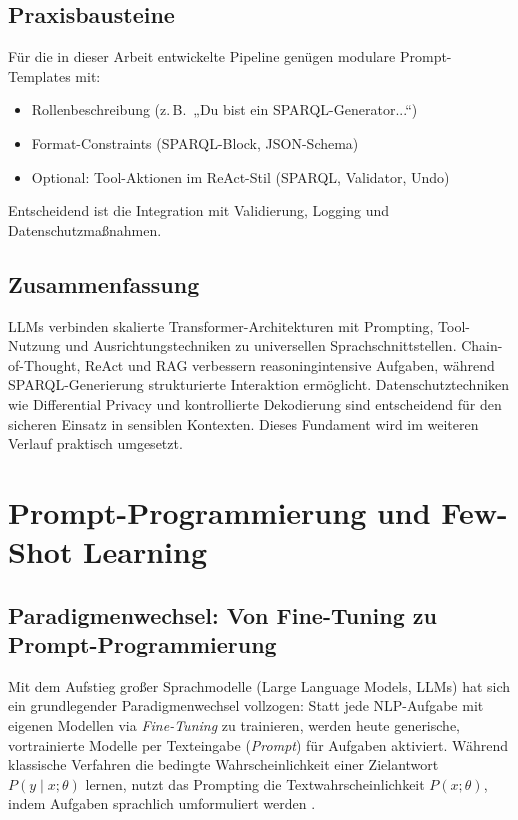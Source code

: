 \subsection{Praxisbausteine}

Für die in dieser Arbeit entwickelte Pipeline genügen modulare Prompt-Templates mit:

\begin{itemize}
    \item Rollenbeschreibung (z.\,B.\ „Du bist ein SPARQL-Generator...“)
    \item Format-Constraints (SPARQL-Block, JSON-Schema)
    \item Optional: Tool-Aktionen im ReAct-Stil (SPARQL, Validator, Undo)
\end{itemize}

Entscheidend ist die Integration mit Validierung, Logging und Datenschutzmaßnahmen.

\subsection{Zusammenfassung}

LLMs verbinden skalierte Transformer-Architekturen mit Prompting, Tool-Nutzung und Ausrichtungstechniken zu universellen Sprachschnittstellen. Chain-of-Thought, ReAct und RAG verbessern reasoningintensive Aufgaben, während SPARQL-Generierung strukturierte Interaktion ermöglicht. Datenschutztechniken wie Differential Privacy und kontrollierte Dekodierung sind entscheidend für den sicheren Einsatz in sensiblen Kontexten. Dieses Fundament wird im weiteren Verlauf praktisch umgesetzt.












\section{Prompt-Programmierung und Few-Shot Learning}
\label{sec:prompting}

\subsection{Paradigmenwechsel: Von Fine-Tuning zu Prompt-Programmierung}

Mit dem Aufstieg großer Sprachmodelle (Large Language Models, LLMs) hat sich ein grundlegender Paradigmenwechsel vollzogen: Statt jede NLP-Aufgabe mit eigenen Modellen via \emph{Fine-Tuning} zu trainieren, werden heute generische, vortrainierte Modelle per Texteingabe (\emph{Prompt}) für Aufgaben aktiviert. Während klassische Verfahren die bedingte Wahrscheinlichkeit einer Zielantwort \(P(y \mid x; \theta)\) lernen, nutzt das Prompting die Textwahrscheinlichkeit \(P(x; \theta)\), indem Aufgaben sprachlich umformuliert werden \cite{liu2023survey}.

